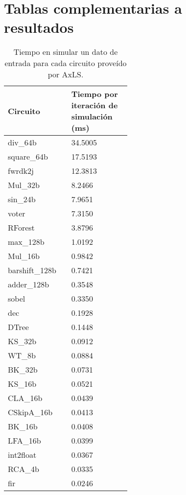 \clearpage

\section{Tablas complementarias a resultados}

\begin{table}[ht]
  \centering
  \caption{Tiempo en simular un dato de entrada para cada circuito proveído por AxLS.}
  \label{tab:timing_info}
  \begin{tabular}{M{0.2\linewidth}M{0.3\linewidth}}
    \toprule
    Circuito & Tiempo por iteración de simulación (\si{\milli\second}) \\
    \midrule
    div\_64b &        34.5005      \\
    square\_64b &      17.5193      \\
    fwrdk2j &          12.3813      \\
    Mul\_32b &        8.2466      \\
    sin\_24b &        7.9651      \\
    voter &            7.3150      \\
    RForest &          3.8796      \\
    max\_128b &        1.0192      \\
    Mul\_16b &        0.9842      \\
    barshift\_128b &  0.7421      \\
    adder\_128b &      0.3548      \\
    sobel &            0.3350      \\
    dec &              0.1928      \\
    DTree &            0.1448      \\
    KS\_32b &          0.0912      \\
    WT\_8b &          0.0884      \\
    BK\_32b &          0.0731      \\
    KS\_16b &          0.0521      \\
    CLA\_16b &        0.0439      \\
    CSkipA\_16b &      0.0413      \\
    BK\_16b &          0.0408      \\
    LFA\_16b &        0.0399      \\
    int2float &        0.0367      \\
    RCA\_4b &          0.0335      \\
    fir &              0.0246      \\
    \bottomrule
  \end{tabular}
\end{table}

